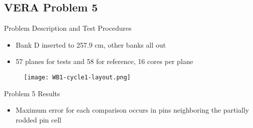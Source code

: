 \subsection{VERA Problem 5}
\begin{frame}[t]{Problem Description and Test Procedures}
    
    \begin{itemize}
      \item Bank D inserted to 257.9 cm, other banks all out
      \item 57 planes for tests and 58 for reference, 16 cores per plane
    \end{itemize}
    \begin{figure}[h]
      \centering
      \texttt{[image: WB1-cycle1-layout.png]}
    \end{figure}
    
\end{frame}


\begin{frame}[t]{Problem 5 Results}
    
    \begin{table}[h]
      \centering
    \end{table}
    \begin{itemize}
        \item Maximum error for each comparison occurs in pins neighboring the partially rodded pin cell
    \end{itemize}
    
\end{frame}

